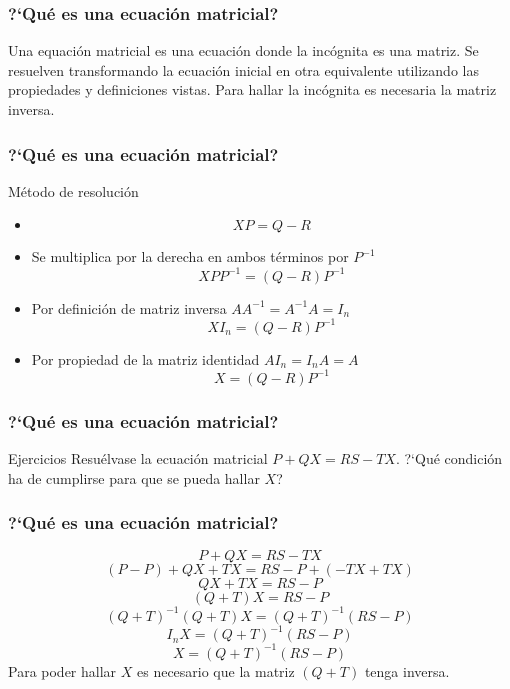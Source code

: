 \documentclass[12pt]{article}
\begin{document}
       \begin{frame}
  \frametitle{?`Qu\'e es una ecuaci\'on matricial?}
Una equaci\'on matricial es una ecuaci\'on donde la inc\'ognita es una matriz. Se resuelven transformando la ecuaci\'on inicial en otra equivalente utilizando las propiedades y definiciones vistas. Para hallar la inc\'ognita es necesaria la matriz inversa. 
  \end{frame} 
  
       \begin{frame}
    \frametitle{?`Qu\'e es una ecuaci\'on matricial?}
       \begin{block}{M\'etodo de resoluci\'on}
\begin{itemize}
\item[]        \[XP = Q-R\]
\item  Se multiplica por la derecha en ambos t\'erminos por $P^{-1}$
\[XPP^{-1} = (Q-R)P^{-1}\]
\item Por definici\'on de matriz inversa $AA^{-1} = A^{-1}A = I_n$
 \[XI_n = (Q-R)P^{-1}\]
\item Por propiedad de la matriz identidad $AI_n = I_nA = A$
\[X=(Q-R)P^{-1}\]  
\end{itemize}
\end{block}
  \end{frame} 
  
  
  
         \begin{frame}
    \frametitle{?`Qu\'e es una ecuaci\'on matricial?}
       \begin{block}{Ejercicios}
Resu\'elvase la ecuaci\'on matricial $P+QX=RS-TX$. ?`Qu\'e condici\'on ha de cumplirse para que se pueda hallar $X$?
\end{block}
  \end{frame} 



  
         \begin{frame}
    \frametitle{?`Qu\'e es una ecuaci\'on matricial?}
\[ P+QX=RS-TX \]\[ (P-P)+QX+TX=RS-P+(-TX+TX)\]
\[ QX+TX=RS-P \]\[ (Q+T)X=RS-P\]
\[  (Q+T)^{-1}(Q+T)X=(Q+T)^{-1}(RS-P)\]\[  I_nX=(Q+T)^{-1}(RS-P) \]
\[  X=(Q+T)^{-1}(RS-P) \]
Para poder hallar $X$ es necesario que la matriz $(Q+T)$ tenga inversa. 
  \end{frame} 
\end{document}
